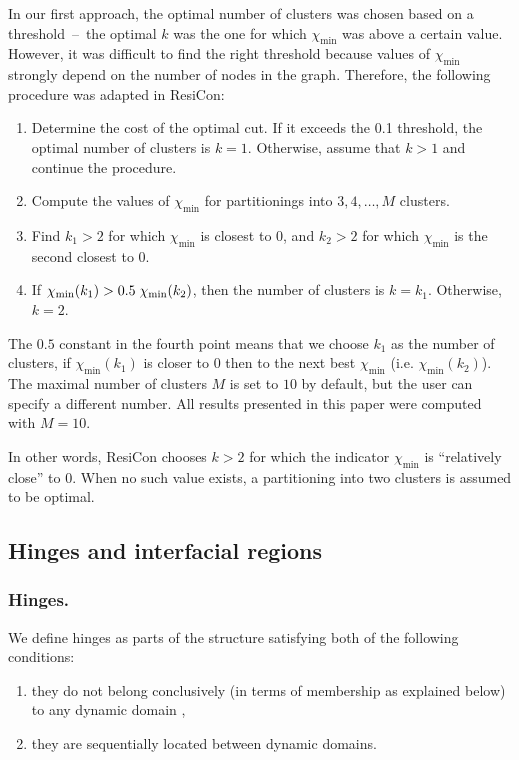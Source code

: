 In our first approach, the optimal number of clusters was chosen based on a threshold~--~the optimal $k$ was the one for which $\chi_{\text{min}}$ was above a certain value.
However, it was difficult to find the right threshold because values of $\chi_{\text{min}}$ strongly depend on the number of nodes in the graph.
Therefore, the following procedure was adapted in ResiCon:
\begin{enumerate}
\item Determine the cost of the optimal cut.
If it exceeds the 0.1 threshold, the optimal number of clusters is $k=1$.
Otherwise, assume that $k>1$ and continue the procedure.
\item Compute the values of $\chi_{\text{min}}$ for partitionings into $ 3,4,\ldots,M$ clusters.
\item Find $k_1>2$ for which $\chi_{\text{min}}$ is closest to 0, and $k_2>2$ for which $\chi_{\text{min}}$ is the second closest to 0.
\item If $\chi_{\text{min}}(k_1)>0.5\hspace{1mm}\chi_\text{min}(k_2)$, then the number of clusters is $k=k_1$.
Otherwise, $k=2$.
\end{enumerate}
The $0.5$ constant in the fourth point means that we choose $k_1$ as the number of clusters, if $\chi_\text{min}(k_1)$ is closer to $0$ then to the next best $\chi_\text{min}$ (i.e. $\chi_\text{min}(k_2)$).
The maximal number of clusters $M$ is set to $10$ by default, but the user can specify a different number.
All results presented in this paper were computed with $M=10$.

In other words, ResiCon chooses $k>2$ for which the indicator $\chi_\text{min}$ is ``relatively close'' to 0.
When no such value exists, a partitioning into two clusters is assumed to be optimal.
\subsection*{Hinges and interfacial regions}
\subsubsection*{Hinges.}
We define hinges as parts of the structure satisfying both of the following conditions:
\begin{enumerate}
\item they do not belong conclusively (in terms of membership as explained below) to any dynamic domain ,
\item they are sequentially located between dynamic domains.
\end{enumerate}

